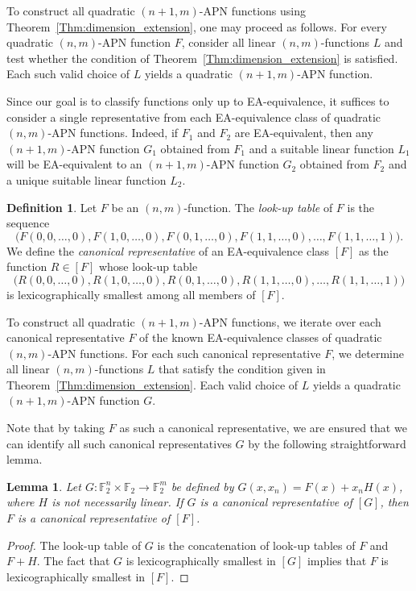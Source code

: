 \documentclass{amsart}[11pt]
\theoremstyle{plain}
\newtheorem{lemma}[theorem]{Lemma}
\theoremstyle{definition}
\newtheorem{definition}[theorem]{Definition}
\numberwithin{theorem}{section}
\numberwithin{equation}{section}
\numberwithin{table}{section}
\numberwithin{figure}{section}
\numberwithin{algorithm}{section}
\def\F{\mathbb F}
\begin{document}
To construct all quadratic $(n+1,m)$-APN functions using Theorem~\ref{Thm:dimension_extension}, one may proceed as follows. For every quadratic $(n,m)$-APN function $F$, consider all linear $(n,m)$-functions $L$ and test whether the condition of Theorem~\ref{Thm:dimension_extension} is satisfied. Each such valid choice of $L$ yields a quadratic $(n+1,m)$-APN function.

Since our goal is to classify functions only up to EA-equivalence, it suffices to consider a single representative from each EA-equivalence class of quadratic $(n,m)$-APN functions. Indeed, if $F_1$ and $F_2$ are EA-equivalent, then any $(n+1,m)$-APN function $G_1$ obtained from $F_1$ and a suitable linear function $L_1$ will be EA-equivalent to an $(n+1,m)$-APN function $G_2$ obtained from $F_2$ and a unique suitable linear function $L_2$.

\begin{definition}
    \label{def:representative}
    Let $F$ be an $(n,m)$-function.
    The \emph{look-up table} of $F$ is the sequence  
    $$\big(F(0,0,\ldots,0), F(1,0,\ldots,0), F(0,1,\ldots,0),  F(1,1,\ldots,0), \ldots, F(1,1,\ldots,1)\big).$$
    We define the \emph{canonical representative} of an EA-equivalence class $[F]$ as the function $R \in [F]$ whose look-up table $$\big(R(0,0,\ldots,0), R(1,0,\ldots,0), R(0,1,\ldots,0), R(1,1,\ldots,0), \ldots, R(1,1,\ldots,1)\big)$$ is lexicographically smallest among all members of $[F]$.
\end{definition}

To construct all quadratic $(n+1,m)$-APN functions, we iterate over each canonical representative $F$ of the known EA-equivalence classes of quadratic $(n,m)$-APN functions.
For each such canonical representative $F$, we determine all linear $(n,m)$-functions $L$ that satisfy the condition given in Theorem~\ref{Thm:dimension_extension}. 
Each valid choice of $L$ yields a quadratic $(n+1,m)$-APN function $G$.

Note that by taking $F$ as such a canonical representative, we are ensured that we can identify all such canonical representatives $G$ by the following straightforward lemma.

\begin{lemma}\label{lemma:concat}
    Let $G\colon \F_2^n \times \F_2 \to \F_2^m$ be defined by $G(x, x_n) = F(x) + x_n H(x)$, where $H$ is not necessarily linear.
    If $G$ is a canonical representative of $[G]$, then $F$ is a canonical representative of $[F]$.
\end{lemma}
\begin{proof}
    The look-up table of $G$ is the concatenation of look-up tables of $F$ and $F + H$. 
    The fact that $G$ is lexicographically smallest in $[G]$ implies that $F$ is lexicographically smallest in $[F]$.
\end{proof}
\end{document}
